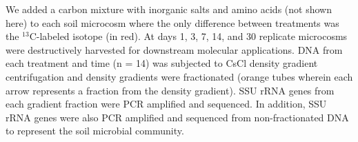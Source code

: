 We added a carbon mixture with inorganic
salts and amino acids (not shown here) to each soil microcosm where the
only difference between treatments was the $^{13}$C-labeled isotope (in red). At days
1, 3, 7, 14, and 30 replicate microcosms were destructively harvested for
downstream molecular applications. DNA from each treatment and time (n = 14)
was subjected to CsCl density gradient centrifugation and density gradients
were fractionated (orange tubes wherein each arrow represents a fraction from
the density gradient). SSU rRNA genes from each gradient fraction were PCR
amplified and sequenced. In addition, SSU rRNA genes were also PCR amplified
and sequenced from non-fractionated DNA to represent the soil microbial
community.


